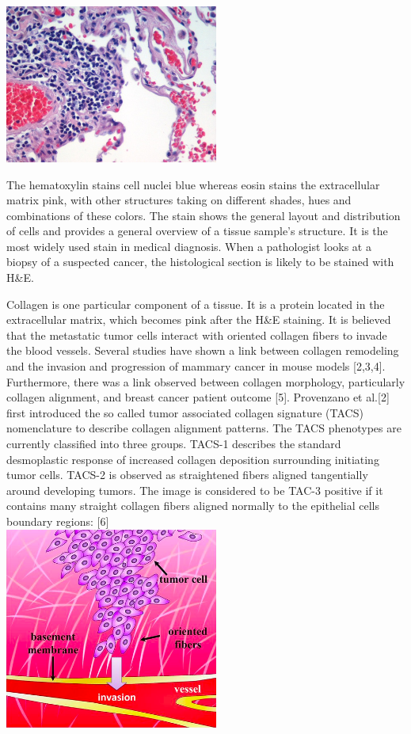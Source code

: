 \documentclass{article}
\begin{document}
\includegraphics[width=7cm]{images/example.jpg}

The hematoxylin stains cell nuclei blue whereas eosin
stains the extracellular matrix pink, with other structures taking on
different shades, hues and combinations of these colors. The stain shows
the general layout and distribution of cells and provides a general
overview of a tissue sample's structure. It is the most widely used stain
in medical diagnosis. When a pathologist looks at a biopsy of a suspected
cancer, the histological section is likely to be stained with H\&E.

Collagen is one particular component of a tissue. It is a protein located
in the extracellular matrix, which becomes pink after the H\&E staining.
It is believed that the metastatic tumor cells interact with oriented
collagen fibers to invade the blood vessels. Several studies have shown a link between
collagen remodeling and the invasion and progression of mammary cancer in mouse
models [2,3,4]. Furthermore, there was a link observed between collagen morphology,
particularly collagen alignment, and breast cancer patient outcome [5]. Provenzano et al.[2]
first introduced the so called tumor associated collagen signature (TACS) nomenclature to
describe collagen alignment patterns. The TACS phenotypes are currently classified into three
groups. TACS-1 describes the standard desmoplastic response of increased collagen deposition
surrounding initiating tumor cells. TACS-2 is observed as straightened fibers aligned
tangentially around developing tumors. The image is considered to be TAC-3 positive if
it contains many straight collagen fibers aligned normally to the epithelial cells boundary
regions: [6] \\

\includegraphics[width=7cm]{images/tac3.png}
\end{document}
